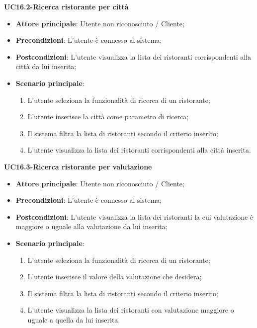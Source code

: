 \textbf{UC16.2-Ricerca ristorante per città}

\begin{itemize}
\item \textbf{Attore principale}: Utente non riconosciuto / Cliente;
\item \textbf{Precondizioni}: L'utente è connesso al sistema;
\item \textbf{Postcondizioni}: L'utente visualizza la lista dei ristoranti corrispondenti alla città da lui inserita;
\item \textbf{Scenario principale}:
\begin{enumerate}
\item L'utente seleziona la funzionalità di ricerca di un ristorante;
\item L'utente inserisce la città come parametro di ricerca;
\item Il sistema filtra la lista di ristoranti secondo il criterio inserito;
\item L'utente visualizza la lista dei ristoranti corrispondenti alla città inserita.
\end{enumerate}
\end{itemize}

\textbf{UC16.3-Ricerca ristorante per valutazione}

\begin{itemize}
\item \textbf{Attore principale}: Utente non riconosciuto / Cliente;
\item \textbf{Precondizioni}: L'utente è connesso al sistema;
\item \textbf{Postcondizioni}: L'utente visualizza la lista dei ristoranti la cui valutazione è maggiore o uguale alla valutazione da lui inserita;
\item \textbf{Scenario principale}:
\begin{enumerate}
\item L'utente seleziona la funzionalità di ricerca di un ristorante;
\item L'utente inserisce il valore della valutazione che desidera;
\item Il sistema filtra la lista di ristoranti secondo il criterio inserito;
\item L'utente visualizza la lista dei ristoranti con valutazione maggiore o uguale a quella da lui inserita.
\end{enumerate}
\end{itemize}

\pagebreak

